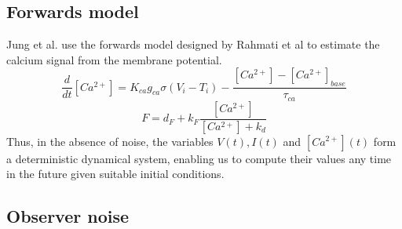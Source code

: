 \documentclass[a4paper,10pt]{article}
\begin{document}
\subsection{Forwards model}
Jung et al. \cite{jung_dynamic_2019} use the forwards model designed by Rahmati et al\cite{rahmati_inferring_2016} to estimate the calcium signal from the membrane potential.
\begin{equation}
   \frac{d}{dt}[Ca^{2+}] = K_{ca} g_{ca} \sigma(V_i - T_i) - \frac{[Ca^{2+}] - [Ca^{2+}]_{base}}{\tau_{ca}}
\end{equation}
\begin{equation}
   F = d_F + k_F \frac{[Ca^{2+}]}{[Ca^{2+}] + k_d}
\end{equation}
Thus, in the absence of noise, the variables $V(t), I(t)$ and $[Ca^{2+}](t)$ form a deterministic dynamical system, enabling us to compute their values any time in the future given suitable initial conditions.

\subsection{Observer noise}
\end{document}
